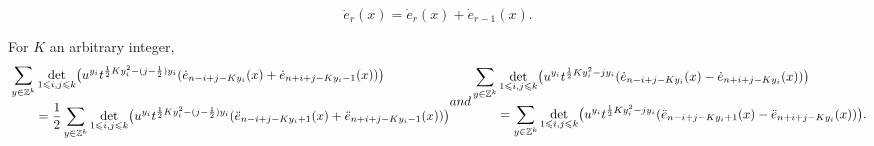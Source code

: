 \documentclass[10pt,a4paper]{amsart}
\renewcommand{\leq}{\leqslant}
\begin{document}
\begin{equation}\label{Eq_ee}
\ddot{e}_r(x)=\dot{e}_r(x)+\dot{e}_{r-1}(x).
\end{equation}

\begin{Lemma}\label{Lem_determinant}
For $K$ an arbitrary integer,
\begin{subequations}
\begin{align}
\begin{aligned}[b]
&\sum_{y\in\mathbb{Z}^k}
\det_{1\leq i,j\leq k}\bigl(u^{y_i}
t^{\frac{1}{2}Ky_i^2-(j-\frac{1}{2})y_i}
 (\dot{e}_{n-i+j-Ky_i}(x)+\dot{e}_{n+i+j-Ky_i-1}(x) )\bigr)
  \\
&\qquad{}=\frac{1}{2}\sum_{y\in\mathbb{Z}^k}
\det_{1\leq i,j\leq k}\bigl(u^{y_i}
t^{\frac{1}{2}Ky_i^2-(j-\frac{1}{2})y_i}
 (\ddot{e}_{n-i+j-Ky_i+1}(x)+\ddot{e}_{n+i+j-Ky_i-1}(x) )\bigr)
 \end{aligned}
\label{Eq_doteddote}
\end{align}
and
\begin{align}
&\sum_{y\in\mathbb{Z}^k}
\det_{1\leq i,j\leq k}\bigl(u^{y_i}
t^{\frac{1}{2}Ky_i^2-j y_i} (
\dot{e}_{n-i+j-Ky_i}(x)-\dot{e}_{n+i+j-Ky_i}(x) )\bigr) \notag \\
&\qquad{}=
\sum_{y\in\mathbb{Z}^k}
\det_{1\leq i,j\leq k}\bigl(u^{y_i}
t^{\frac{1}{2}Ky_i^2-j y_i} (
\ddot{e}_{n-i+j-Ky_i+1}(x)-\ddot{e}_{n+i+j-Ky_i}(x) )\bigr).
\label{Eq_doteddote2}
\end{align}
\end{subequations}
\end{Lemma}
\end{document}

